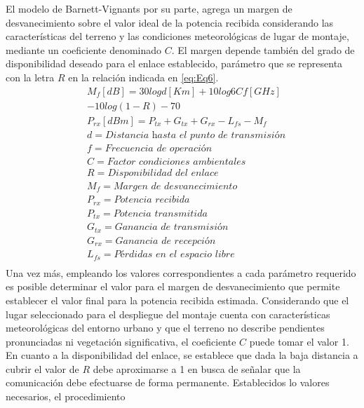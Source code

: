 \documentclass[conference]{IEEEtran}
\begin{document}
El modelo de Barnett-Vignants por su parte, agrega un margen de desvanecimiento sobre el valor ideal de
la potencia recibida considerando las características del terreno y las condiciones meteorológicas de lugar
de montaje, mediante un coeficiente denominado $C$. El margen depende también del grado de disponibilidad deseado 
para el enlace establecido, parámetro que se representa con la letra $R$ en la relación indicada en \ref{eq:Eq6}. 
\begin{equation}
    \label{eq:Eq6}
    \begin{aligned}
        &M_{f}[dB] = 30logd[Km] + 10log6Cf[GHz]\\
        & - 10log(1-R) - 70\\
        &P_{rx}[dBm] = P_{tx} + G_{tx} + G_{rx} - L_{fs} - M_{f}\\
        &d = \textit{Distancia hasta el punto de transmisión}\\
        &f = \textit{Frecuencia de operación}\\
        &C = \textit{Factor condiciones ambientales}\\
        &R = \textit{Disponibilidad del enlace}\\
        &M_{f} = \textit{Margen de desvanecimiento}\\
        &P_{rx} = \textit{Potencia recibida}\\
        &P_{tx} = \textit{Potencia transmitida}\\
        &G_{tx} = \textit{Ganancia de transmisión}\\
        &G_{rx} = \textit{Ganancia de recepción}\\
        &L_{fs} = \textit{Pérdidas en el espacio libre}\\
    \end{aligned}
\end{equation}
Una vez más, empleando los valores correspondientes a cada parámetro requerido es posible determinar el valor
para el margen de desvanecimiento que permite establecer el valor final para la potencia recibida estimada. Considerando
que el lugar seleccionado para el despliegue del montaje cuenta con características meteorológicas del entorno urbano y
que el terreno no describe pendientes pronunciadas ni vegetación significativa, el coeficiente $C$ puede tomar el valor 1.
En cuanto a la disponibilidad del enlace, se establece que dada la baja distancia a cubrir el valor de $R$ debe aproximarse 
a 1 en busca de señalar que la comunicación debe efectuarse de forma permanente. Establecidos lo valores necesarios, el procedimiento 
\end{document}
